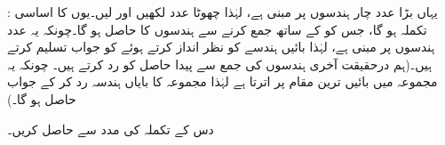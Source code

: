 :\quad 
یہاں بڑا عدد    چار ہندسوں پر مبنی ہے،  لہٰذا چھوٹا  عدد   لکھیں اور    لیں۔یوں  کا اساسی  تکملہ   ہو گا، جس کو  کے ساتھ جمع کرنے سے   ہندسوں کا     حاصل ہو گا۔چونکہ یہ عدد  ہندسوں پر مبنی ہے،  لہٰذا  بائیں ہندسے   کو نظر انداز کرتے ہوئے  کو جواب تسلیم کرتے ہیں۔(ہم درحقیقت آخری ہندسوں کی جمع سے پیدا حاصل  کو رد کرتے ہیں۔ چونکہ یہ مجموعہ میں بائیں ترین مقام پر اترتا ہے لہٰذا مجموعہ کا بایاں ہندسہ رد کر کے جواب حاصل ہو گا۔)
\begin{center}
\begin{otherlanguage}{english}
\quad\quad
{}
\end{otherlanguage}
\end{center}
دس کے تکملہ    کی مدد سے    حاصل کریں۔ 

